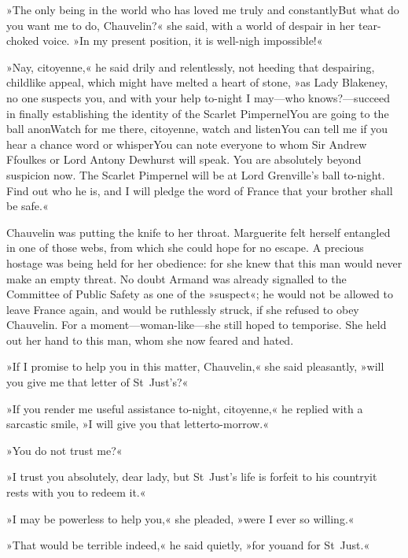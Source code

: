 »The only being in the world who has loved me truly and constantly\textellipsis \allowbreak  But what do you want me to do, Chauvelin?« she said, with a world of despair in her tear-choked voice. »In my present position, it is well-nigh impossible!«

»Nay, citoyenne,« he said drily and relentlessly, not heeding that despairing, childlike appeal, which might have melted a heart of stone, »as Lady Blakeney, no one suspects you, and with your help to-night I may—who knows?—succeed in finally establishing the identity of the Scarlet Pimpernel\textellipsis \allowbreak  You are going to the ball anon\textellipsis \allowbreak  Watch for me there, citoyenne, watch and listen\textellipsis \allowbreak  You can tell me if you hear a chance word or whisper\textellipsis \allowbreak  You can note everyone to whom Sir Andrew Ffoulkes or Lord Antony Dewhurst will speak. You are absolutely beyond suspicion now. The Scarlet Pimpernel will be at Lord Grenville's ball to-night. Find out who he is, and I will pledge the word of France that your brother shall be safe.«

Chauvelin was putting the knife to her throat. Marguerite felt herself entangled in one of those webs, from which she could hope for no escape. A precious hostage was being held for her obedience: for she knew that this man would never make an empty threat. No doubt Armand was already signalled to the Committee of Public Safety as one of the »suspect«; he would not be allowed to leave France again, and would be ruthlessly struck, if she refused to obey Chauvelin. For a moment—woman-like—she still hoped to temporise. She held out her hand to this man, whom she now feared and hated.

»If I promise to help you in this matter, Chauvelin,« she said pleasantly, »will you give me that letter of St~Just's?«

»If you render me useful assistance to-night, citoyenne,« he replied with a sarcastic smile, »I will give you that letter\textellipsis \allowbreak  \allowbreak to-morrow.«

»You do not trust me?«

»I trust you absolutely, dear lady, but St~Just's life is forfeit to his country\textellipsis \allowbreak  it rests with you to redeem it.«

»I may be powerless to help you,« she pleaded, »were I ever so willing.«

»That would be terrible indeed,« he said quietly, »for you\textellipsis \allowbreak  and for St~Just.«


